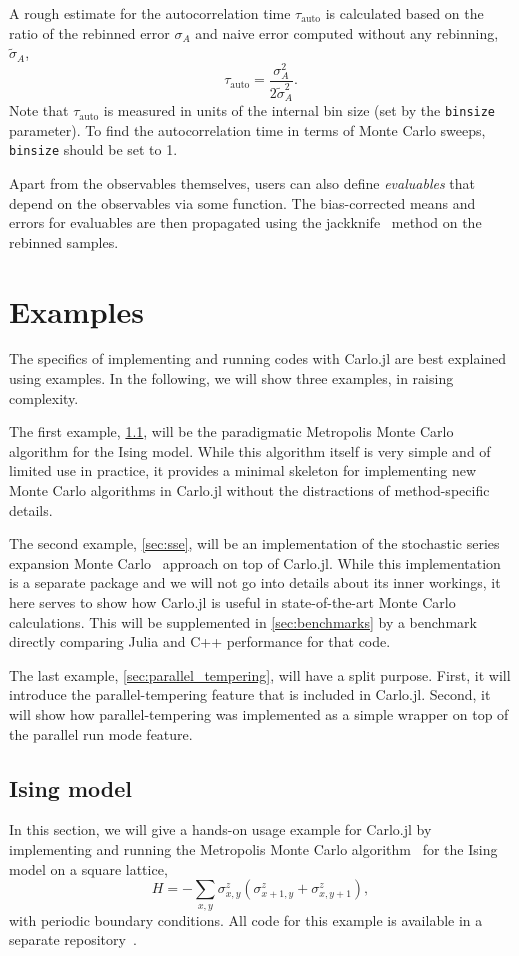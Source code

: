 \documentclass{SciPost}
\begin{document}
A rough estimate for the autocorrelation time $\tau_\text{auto}$ is calculated based on the ratio of the rebinned error $\sigma_A$ and naive error computed without any rebinning, $\tilde{\sigma}_A$,~\cite{Ambegaokar2010}
\begin{equation}
\label{eq:autocorr}
\tau_\text{auto} = \frac{\sigma_A^2}{2\tilde{\sigma}^2_A}.
\end{equation}
Note that $\tau_\text{auto}$ is measured in units of the internal bin size (set by the \texttt{binsize} parameter). To find the autocorrelation time in terms of Monte Carlo sweeps, \texttt{binsize} should be set to 1.

 Apart from the observables themselves, users can also define \textit{evaluables} that depend on the observables via some function. The bias-corrected means and errors for evaluables are then 
propagated using the jackknife~\cite{Miller1974} method on the rebinned samples.
\section{Examples}
\label{sec:examples}
The specifics of implementing and running codes with Carlo.jl are best explained using examples. In the following, we will show three examples, in raising complexity.

The first example, \cref{sec:ising}, will be the paradigmatic Metropolis Monte Carlo algorithm for the Ising model. While this algorithm itself is very simple and of limited use in practice, it provides a minimal skeleton for implementing new Monte Carlo algorithms in Carlo.jl without the distractions of method-specific details.

The second example, \cref{sec:sse}, will be an implementation of the stochastic series expansion Monte Carlo~\cite{Sandvik1999} approach on top of Carlo.jl. While this implementation is a separate package and we will not go into details about its inner workings, it here serves to show how Carlo.jl is useful in state-of-the-art Monte Carlo calculations. This will be supplemented in \cref{sec:benchmarks} by a benchmark directly comparing Julia and C++ performance for that code.

The last example, \cref{sec:parallel_tempering}, will have a split purpose. First, it will introduce the parallel-tempering feature that is included in Carlo.jl. Second, it will show how parallel-tempering was implemented as a simple wrapper on top of the parallel run mode feature.
\subsection{Ising model}
\label{sec:ising}
In this section, we will give a hands-on usage example for Carlo.jl by implementing and running the Metropolis Monte Carlo algorithm~\cite{Metropolis1953} for the Ising model on a square lattice,
\begin{equation}
H = -\sum_{x,y} \sigma^z_{x,y} (\sigma^z_{x+1,y} + \sigma^z_{x,y+1}),
\end{equation}
with periodic boundary conditions.
All code for this example is available in a separate repository~\cite{IsingExample}.
\end{document}
